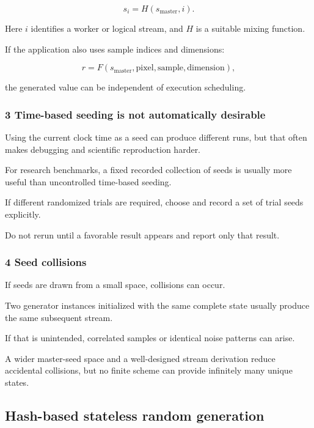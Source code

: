 \[
 s_i=H(s_{\mathrm{master}},i).
\]

Here \(i\) identifies a worker or logical stream, and \(H\) is a suitable mixing function.

If the application also uses sample indices and dimensions:

\[
 r=F(s_{\mathrm{master}},\text{pixel},\text{sample},\text{dimension}),
\]

the generated value can be independent of execution scheduling.

\subsubsection{3 Time-based seeding is not automatically desirable}\label{02-foundations-ii-ch029-time-based-seeding-is-not-automatically-desirable}

Using the current clock time as a seed can produce different runs, but that often makes debugging and scientific reproduction harder.

For research benchmarks, a fixed recorded collection of seeds is usually more useful than uncontrolled time-based seeding.

If different randomized trials are required, choose and record a set of trial seeds explicitly.

Do not rerun until a favorable result appears and report only that result.

\subsubsection{4 Seed collisions}\label{02-foundations-ii-ch029-seed-collisions}

If seeds are drawn from a small space, collisions can occur.

Two generator instances initialized with the same complete state usually produce the same subsequent stream.

If that is unintended, correlated samples or identical noise patterns can arise.

A wider master-seed space and a well-designed stream derivation reduce accidental collisions, but no finite scheme can provide infinitely many unique states.

\subsection{Hash-based stateless random generation}\label{02-foundations-ii-ch029-hash-based-stateless-random-generation}

